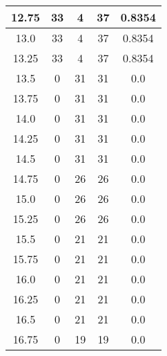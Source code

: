 \documentclass[letterpaper, 12pt]{article}
\begin{document}
\begin{longtable}{|c|c|c|c|c|}
\hline
12.75 & 33 & 4 & 37 & 0.8354 \\
\hline
13.0 & 33 & 4 & 37 & 0.8354 \\
\hline
13.25 & 33 & 4 & 37 & 0.8354 \\
\hline
13.5 & 0 & 31 & 31 & 0.0 \\
\hline
13.75 & 0 & 31 & 31 & 0.0 \\
\hline
14.0 & 0 & 31 & 31 & 0.0 \\
\hline
14.25 & 0 & 31 & 31 & 0.0 \\
\hline
14.5 & 0 & 31 & 31 & 0.0 \\
\hline
14.75 & 0 & 26 & 26 & 0.0 \\
\hline
15.0 & 0 & 26 & 26 & 0.0 \\
\hline
15.25 & 0 & 26 & 26 & 0.0 \\
\hline
15.5 & 0 & 21 & 21 & 0.0 \\
\hline
15.75 & 0 & 21 & 21 & 0.0 \\
\hline
16.0 & 0 & 21 & 21 & 0.0 \\
\hline
16.25 & 0 & 21 & 21 & 0.0 \\
\hline
16.5 & 0 & 21 & 21 & 0.0 \\
\hline
16.75 & 0 & 19 & 19 & 0.0 \\
\hline
\end{longtable}
\end{document}
